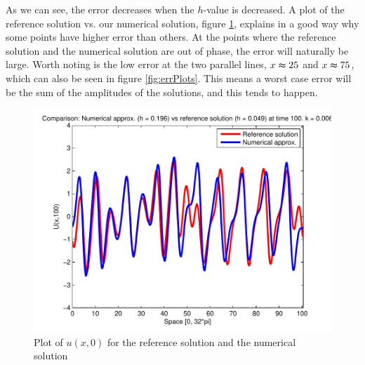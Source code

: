 As we can see, the error decreases when the $h$-value is decreased. A plot of the reference solution vs. our numerical solution, figure \ref{fig:errTime}, explains in a good way why some points have higher error than others. At the points where the reference solution and the numerical solution are out of phase, the error will naturally be large. Worth noting is the low error at the two parallel lines, $x \thickapprox 25$ and $x \thickapprox 75$, which can also be seen in figure \ref{fig:errPlots}. This means a worst case error will be the sum of the amplitudes of the solutions, and this tends to happen.

\begin{figure}[H]
\centering
\includegraphics[scale=0.55]
{PDFs/IMEX/comp_num_ref_t100.pdf}
\caption{Plot of $u(x,0)$ for the reference solution and the numerical solution}
\label{fig:errTime}
\end{figure}